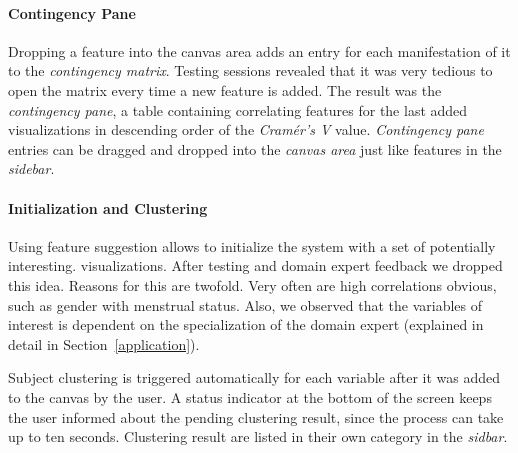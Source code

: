 \documentclass[journal]{style/vgtc} 			          %
\newcommand{\com}[1]{\textcolor{orange}{\uline{#1}}}
\begin{document}
\paragraph{Contingency Pane}
Dropping a feature into the canvas area adds an entry for each manifestation of it to the \emph{contingency matrix}.
%
Testing sessions revealed that it was very tedious to open the matrix every time a new feature is added. 
%
The result was the \emph{contingency pane}, a table containing correlating features for the last added visualizations in descending order of the \emph{Cram\'{e}r's V} value.
%
\emph{Contingency pane} entries can be dragged and dropped into the \emph{canvas area} just like features in the \emph{sidebar}.
%
\paragraph{Initialization and Clustering}
Using feature suggestion allows to initialize the system with a set of potentially interesting. visualizations.
%
After testing and domain expert feedback we dropped this idea.
%
Reasons for this are twofold.
%
Very often are high correlations obvious, such as gender with menstrual status.
%
Also, we observed that the variables of interest is dependent on the specialization of the domain expert (explained in detail in Section~\ref{application}).

Subject clustering is triggered automatically for each variable after it was added to the canvas by the user.
%
A status indicator at the bottom of the screen keeps the user informed about the pending clustering result, since the process can take up to ten seconds.
%
Clustering result are listed in their own category in the \emph{sidbar}.
%

\end{document}
